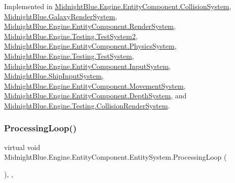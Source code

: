 Implemented in \hyperlink{class_midnight_blue_1_1_engine_1_1_entity_component_1_1_collision_system_a0fe9a2023d5fabc7861b50abfc607def}{Midnight\+Blue.\+Engine.\+Entity\+Component.\+Collision\+System}, \hyperlink{class_midnight_blue_1_1_galaxy_render_system_aabbf61a4bcfb7c026d2d0c9fbe90569f}{Midnight\+Blue.\+Galaxy\+Render\+System}, \hyperlink{class_midnight_blue_1_1_engine_1_1_entity_component_1_1_render_system_aca6ccedef98243f0de2b2d83daa9a2bd}{Midnight\+Blue.\+Engine.\+Entity\+Component.\+Render\+System}, \hyperlink{class_midnight_blue_1_1_engine_1_1_testing_1_1_test_system2_ab8a9ea91aa5b014101ce418f66889ab0}{Midnight\+Blue.\+Engine.\+Testing.\+Test\+System2}, \hyperlink{class_midnight_blue_1_1_engine_1_1_entity_component_1_1_physics_system_ab54f8db4bba2df1072b0fa3a3f4d47de}{Midnight\+Blue.\+Engine.\+Entity\+Component.\+Physics\+System}, \hyperlink{class_midnight_blue_1_1_engine_1_1_testing_1_1_test_system_ac62a56362815c277e8c784246932fab4}{Midnight\+Blue.\+Engine.\+Testing.\+Test\+System}, \hyperlink{class_midnight_blue_1_1_engine_1_1_entity_component_1_1_input_system_a4aef070eb239e7328e6a61fee3e4d477}{Midnight\+Blue.\+Engine.\+Entity\+Component.\+Input\+System}, \hyperlink{class_midnight_blue_1_1_ship_input_system_ac504beb5b6afa47ca4618d9683e46946}{Midnight\+Blue.\+Ship\+Input\+System}, \hyperlink{class_midnight_blue_1_1_engine_1_1_entity_component_1_1_movement_system_a7424e4fc15c75e0f663d31110fe6792a}{Midnight\+Blue.\+Engine.\+Entity\+Component.\+Movement\+System}, \hyperlink{class_midnight_blue_1_1_engine_1_1_entity_component_1_1_depth_system_a5351ff290c847e93fb96dac6cc43719d}{Midnight\+Blue.\+Engine.\+Entity\+Component.\+Depth\+System}, and \hyperlink{class_midnight_blue_1_1_engine_1_1_testing_1_1_collision_render_system_aac900f09888531eaad6453b8534f99ab}{Midnight\+Blue.\+Engine.\+Testing.\+Collision\+Render\+System}.

\hypertarget{class_midnight_blue_1_1_engine_1_1_entity_component_1_1_entity_system_a3c740dc07a8f53fb9a1ae0769833d5ad}{}\label{class_midnight_blue_1_1_engine_1_1_entity_component_1_1_entity_system_a3c740dc07a8f53fb9a1ae0769833d5ad} 
\subsubsection{\texorpdfstring{Processing\+Loop()}{ProcessingLoop()}}
{\footnotesize\ttfamily virtual void Midnight\+Blue.\+Engine.\+Entity\+Component.\+Entity\+System.\+Processing\+Loop (\begin{DoxyParamCaption}{ }\end{DoxyParamCaption})\hspace{0.3cm}{\ttfamily [inline]}, {\ttfamily [protected]}, {\ttfamily [virtual]}}



